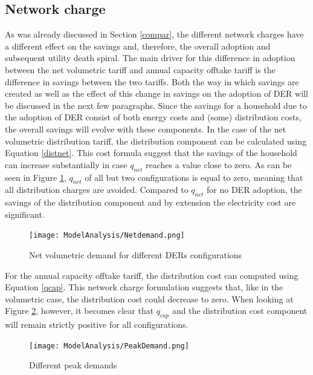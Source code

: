 \subsection{Network charge}
\label{distanal} As was already discussed in Section \ref{compar}, the different network charges have a different effect on the savings and, therefore, the overall adoption and subsequent utility death spiral. The main driver for this difference in adoption between the net volumetric tariff and annual capacity offtake tariff is the difference in savings between the two tariffs. Both the way in which savings are created as well as the effect of this change in savings on the adoption of DER will be discussed in the next few paragraphs.
\newline \newline \noindent
Since the savings for a household due to the adoption of DER consist of both energy costs and (some) distribution costs, the overall savings will evolve with these components. In the case of the net volumetric distribution tariff, the distribution component can be calculated using Equation \ref{distnet}. This cost formula suggest that the savings of the household can increase substantially in case $q_{net}$ reaches a value close to zero. As can be seen in Figure \ref{Figure:netdem}, $q_{net}$  of all but two configurations is equal to zero, meaning that all distribution charges are avoided. Compared to $q_{net}$ for no DER adoption, the savings of the distribution component and by extension the electricity cost are significant. 
\begin{figure}[h!]
\centering
\texttt{[image: ModelAnalysis/Netdemand.png]}
\caption{Net volumetric demand for different DERs configurations}
\label{Figure:netdem}
\end{figure}
\noindent
For the annual capacity offtake tariff, the distribution cost can computed using Equation \ref{qcap}. This network charge formulation suggests that, like in the volumetric case, the distribution cost could decrease to zero. When looking at Figure \ref{Figure:peakdem}, however, it becomes clear that $q_{cap}$ and the distribution cost component will remain strictly positive for all configurations.  
\begin{figure}[h!]
\centering
\texttt{[image: ModelAnalysis/PeakDemand.png]}
\caption{Different peak demands}
\label{Figure:peakdem}
\end{figure}
\noindent
